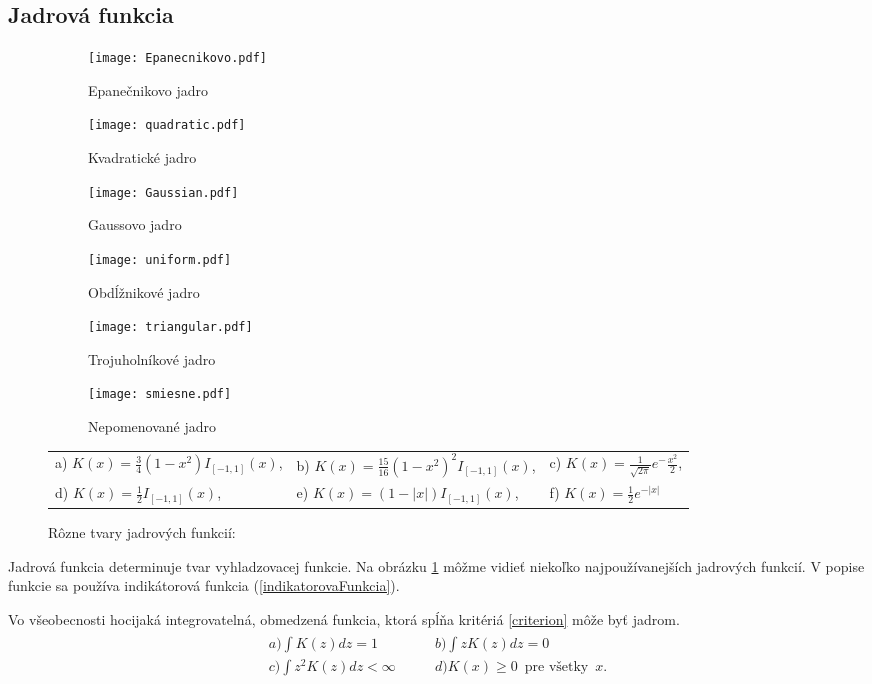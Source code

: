 \subsection{Jadrová funkcia}
\begin{figure}[!ht]
\centering
\begin{subfigure}{.3\textwidth}
  \centering
  \texttt{[image: Epanecnikovo.pdf]}
  \caption{Epanečnikovo jadro}
\end{subfigure}%
\begin{subfigure}{.3\textwidth}
  \centering
  \texttt{[image: quadratic.pdf]}
  \caption{Kvadratické jadro}
\end{subfigure}
\begin{subfigure}{.3\textwidth}
  \centering
  \texttt{[image: Gaussian.pdf]}
  \caption{Gaussovo jadro}
\end{subfigure}
\begin{subfigure}{.3\textwidth}
  \centering
  \texttt{[image: uniform.pdf]}
  \caption{Obdĺžnikové jadro}
\end{subfigure}
\begin{subfigure}{.3\textwidth}
  \centering
  \texttt{[image: triangular.pdf]}
  \caption{Trojuholníkové jadro}
\end{subfigure}
\begin{subfigure}{.3\textwidth}
  \centering
  \texttt{[image: smiesne.pdf]}
  \caption{Nepomenované jadro}
\end{subfigure}
\centering
\caption{Rôzne tvary jadrových funkcií:}\label{kernelShapeTypes}
\begin{tabular}{ l l l }
 a) $K(x)=\frac{3}{4}(1-x^2)I_{[-1,1]}(x)$, & b) $K(x)=\frac{15}{16}(1-x^2)^2I_{[-1,1]}(x)$, & c) $K(x)=\frac{1}{\sqrt{2\pi}}e^-\frac{x^2}{2} $, \\
 d) $K(x)=\frac{1}{2}I_{[-1,1]}(x) $, & e) $K(x)=(1-|x|)I_{[-1,1]}(x)$, & f) $K(x)=\frac{1}{2}e^{-|x|}$
 \end{tabular}
 
\end{figure}

Jadrová funkcia determinuje tvar vyhladzovacej funkcie. Na obrázku \ref{kernelShapeTypes} môžme vidieť niekoľko najpoužívanejších jadrových funkcií. V popise funkcie sa používa indikátorová funkcia (\ref{indikatorovaFunkcia}).

Vo všeobecnosti hocijaká integrovatelná, obmedzená funkcia, ktorá spĺňa kritériá \ref{criterion} môže byť jadrom.
\begin{align}\label{criterion}
\begin{split}
a) \int K(z)dz = 1 \qquad & b) \int zK(z)dz = 0 \\ 
c) \int z^2K(z)dz < \infty \qquad & d) K(x) \geq 0 \enspace \textrm{pre všetky} \enspace x.
\end{split}
\end{align} 

